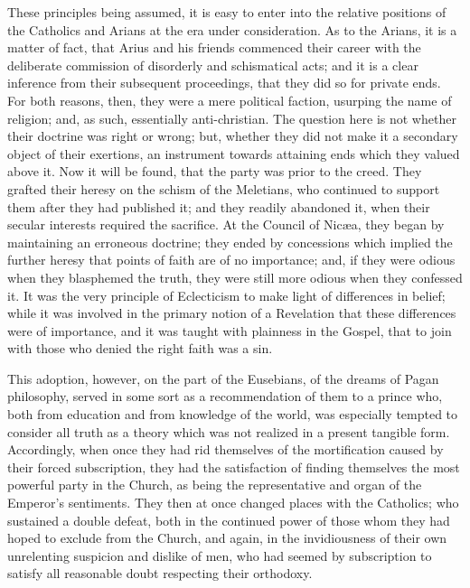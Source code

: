 These principles being assumed, it is easy to enter into the
relative positions of the Catholics and Arians at the era under
consideration. As to the Arians, it is a matter of fact, that Arius
and his friends commenced their career with the deliberate commission
of disorderly and schismatical acts; and it is a clear inference from
their subsequent proceedings, that they did so for private ends. For
both reasons, then, they were a mere political faction, usurping the
name of religion; and, as such, essentially anti-christian. The
question here is not whether their doctrine was right or wrong; but,
whether they did not make it a secondary object of their exertions, an
instrument towards attaining ends which they valued above it. Now it
will be found, that the party was prior to the creed. They grafted
their heresy on the schism of the Meletians, who continued to support
them after they had published it; and they readily abandoned it, when
their secular interests required the sacrifice. At the Council of
Nicæa, they began by maintaining an erroneous doctrine; they ended by
concessions which implied the further heresy that points of faith are
of no importance; and, if they were odious when they blasphemed the
truth, they were still more odious when they confessed it. It
was the very principle of Eclecticism to make light of differences in
belief; while it was involved in the primary notion of a Revelation
that these differences were of importance, and it was taught with
plainness in the Gospel, that to join with those who denied the right
faith was a sin.

This adoption, however, on the part of the Eusebians, of the dreams
of Pagan philosophy, served in some sort as a recommendation of them
to a prince who, both from education and from knowledge of the world,
was especially tempted to consider all truth as a theory which was not
realized in a present tangible form. Accordingly, when once they had
rid themselves of the mortification caused by their forced
subscription, they had the satisfaction of finding themselves the most
powerful party in the Church, as being the representative and organ of
the Emperor's sentiments. They then at once changed places with the
Catholics; who sustained a double defeat, both in the continued power
of those whom they had hoped to exclude from the Church, and again, in
the invidiousness of their own unrelenting suspicion and dislike of
men, who had seemed by subscription to satisfy all reasonable doubt
respecting their orthodoxy.

